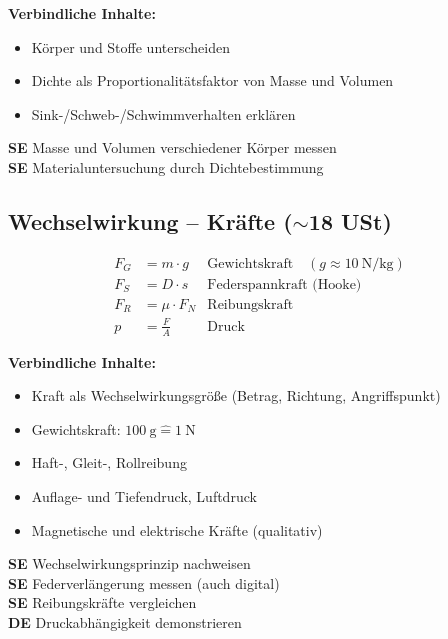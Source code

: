 \documentclass[11pt,a4paper]{article}
\newcommand{\SE}{\textcolor{accentgreen}{\textbf{SE}}}
\newcommand{\DE}{\textcolor{physikblue}{\textbf{DE}}}
\begin{document}
\textbf{Verbindliche Inhalte:}
\begin{itemize}[leftmargin=0.5cm, itemsep=1pt]
\item Körper und Stoffe unterscheiden
\item Dichte als Proportionalitätsfaktor von Masse und Volumen
\item Sink-/Schweb-/Schwimmverhalten erklären
\end{itemize}

\begin{experimentbox}
\SE{} Masse und Volumen verschiedener Körper messen\\
\SE{} Materialuntersuchung durch Dichtebestimmung
\end{experimentbox}

\subsection{Wechselwirkung -- Kräfte ($\sim$18 USt)}

\begin{formelbox}
\begin{align*}
F_G &= m \cdot g & \text{Gewichtskraft} \quad (g \approx \SI{10}{\newton\per\kilogram}) \\
F_S &= D \cdot s & \text{Federspannkraft (Hooke)} \\
F_R &= \mu \cdot F_N & \text{Reibungskraft} \\
p &= \frac{F}{A} & \text{Druck}
\end{align*}
\end{formelbox}

\textbf{Verbindliche Inhalte:}
\begin{itemize}[leftmargin=0.5cm, itemsep=1pt]
\item Kraft als Wechselwirkungsgröße (Betrag, Richtung, Angriffspunkt)
\item Gewichtskraft: $\SI{100}{\gram} \hat{=} \SI{1}{\newton}$
\item Haft-, Gleit-, Rollreibung
\item Auflage- und Tiefendruck, Luftdruck
\item Magnetische und elektrische Kräfte (qualitativ)
\end{itemize}

\begin{experimentbox}
\SE{} Wechselwirkungsprinzip nachweisen\\
\SE{} Federverlängerung messen (auch digital)\\
\SE{} Reibungskräfte vergleichen\\
\DE{} Druckabhängigkeit demonstrieren
\end{experimentbox}
\end{document}
